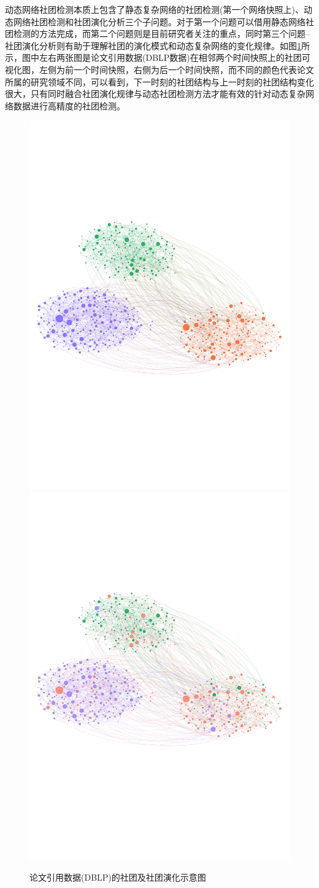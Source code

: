 动态网络社团检测本质上包含了静态复杂网络的社团检测(第一个网络快照上)、动态网络社团检测和社团演化分析三个子问题。对于第一个问题可以借用静态网络社团检测的方法完成，而第二个问题则是目前研究者关注的重点，同时第三个问题--社团演化分析则有助于理解社团的演化模式和动态复杂网络的变化规律。如图\ref{fig.3}所示，图中左右两张图是论文引用数据(DBLP数据)在相邻两个时间快照上的社团可视化图，左侧为前一个时间快照，右侧为后一个时间快照，而不同的颜色代表论文所属的研究领域不同，可以看到，下一时刻的社团结构与上一时刻的社团结构变化很大，只有同时融合社团演化规律与动态社团检测方法才能有效的针对动态复杂网络数据进行高精度的社团检测。
\begin{figure}[!htbp]
	\setlength{\abovecaptionskip}{0pt} 
	\setlength{\belowcaptionskip}{10pt} 
	\includegraphics[width=.48\textwidth]{./figure/community1.pdf}
	\includegraphics[width=.48\textwidth]{./figure/community2.pdf}
	\caption{论文引用数据(DBLP)的社团及社团演化示意图}
	\label{fig.3}
\end{figure}

